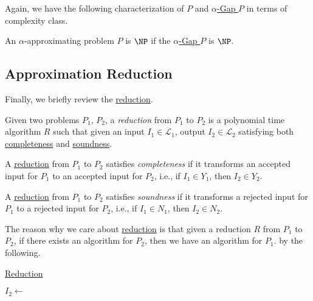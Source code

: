 Again, we have the following characterization of \(P\) and \hyperref[def:Gap]{\(\alpha \)-Gap \(P\)} in terms of complexity class.

\begin{definition}
	An \(\alpha \)-approximating problem \(P\) is \(\NP\) if the \hyperref[def:Gap]{\(\alpha \)-Gap \(P\)} is \(\NP\).
\end{definition}

\subsection{Approximation Reduction}
Finally, we briefly review the \hyperref[def:reduction]{reduction}.

\begin{prev}[Reduction]
	Given two problems \(P_1\), \(P_2\), a \emph{reduction} from \(P_1\) to \(P_2\) is a polynomial time algorithm \(R\) such that given an input \(I_1\in \mathcal{L}_1 \), output \(I_2\in \mathcal{L} _2\) satisfying both \hyperref[def:completeness]{completeness} and \hyperref[def:soundness]{soundness}.
	\begin{prev}[Completeness]
		A \hyperref[def:reduction]{reduction} from \(P_1\) to \(P_2\) satisfies \emph{completeness} if it transforms an accepted input for \(P_1\) to an accepted input for \(P_2\), i.e., if \(I_1\in Y_1\), then \(I_2\in Y_2\).
	\end{prev}
	\begin{prev}[Soundness]
		A \hyperref[def:reduction]{reduction} from \(P_1\) to \(P_2\) satisfies \emph{soundness} if it transforms a rejected input for \(P_1\) to a rejected input for \(P_2\), i.e., if \(I_1\in N_1\), then \(I_2\in N_2\).
	\end{prev}
\end{prev}

The reason why we care about \hyperref[def:reduction]{reduction} is that given a reduction \(R\) from \(P_1\) to \(P_2\), if there exists an algorithm for \(P_2\), then we have an algorithm for \(P_1\). by the following.

\begin{algorithm}[H]\label{algo:reduction}
	\DontPrintSemicolon
	\caption{\hyperref[def:reduction]{Reduction}}
	\BlankLine
	\(I_2\gets\)\;
\end{algorithm}

